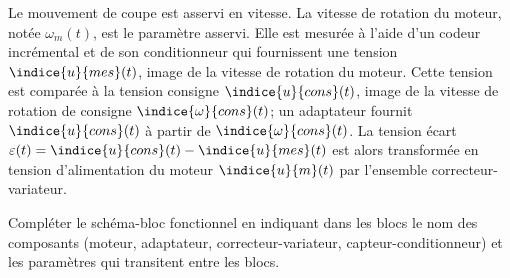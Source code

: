 \ifprof
\else
Le mouvement de coupe est asservi en vitesse. La vitesse de rotation du moteur, notée $\omega_m(t)$, est
le paramètre asservi. Elle est mesurée à l’aide d’un codeur incrémental et de son conditionneur qui
fournissent une tension $\indice{u}{mes}(t)$, image de la vitesse de rotation du moteur. Cette tension est comparée à
la tension consigne $\indice{u}{cons}(t)$, image de la vitesse de rotation de consigne $\indice{\omega}{cons}(t)$; un adaptateur fournit $\indice{u}{cons}(t)$ à partir de $\indice{\omega}{cons}(t)$. La tension écart $\varepsilon(t) = \indice{u}{cons}(t) - \indice{u}{mes}(t)$ est alors transformée en tension
d’alimentation du moteur $\indice{u}{m}(t)$ par l’ensemble correcteur-variateur.
\fi


\begin{question}
Compléter le schéma-bloc fonctionnel en indiquant dans les blocs
le nom des composants (moteur, adaptateur, correcteur-variateur, capteur-conditionneur) et les
paramètres qui transitent entre les blocs.
\end{question}
\ifprof
\begin{corrige}
\footnotesize
\begin{center}
\end{center}


\normalsize
\end{corrige}
\else
\footnotesize
